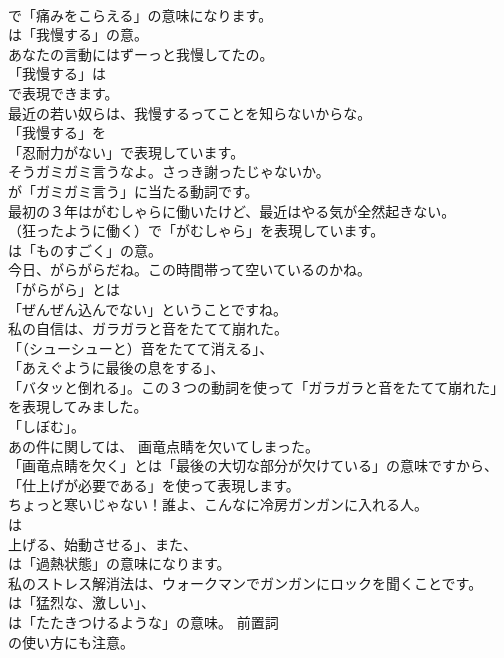 \documentclass[8pt]{extreport}
\begin{document}
\begin{CJK}{UTF8}{min}
\\	で「痛みをこらえる」の意味になります。
\\	は「我慢する」の意。	
\\	あなたの言動にはずーっと我慢してたの。 
\\	「我慢する」は 
\\	で表現できます。	
\\	最近の若い奴らは、我慢するってことを知らないからな。 
\\	「我慢する」を
\\	「忍耐力がない」で表現しています。	
\\	そうガミガミ言うなよ。さっき謝ったじゃないか。 
\\	が「ガミガミ言う」に当たる動詞です。	
\\	最初の３年はがむしゃらに働いたけど、最近はやる気が全然起きない。 
\\	（狂ったように働く）で「がむしゃら」を表現しています。
\\	は「ものすごく」の意。	
\\	今日、がらがらだね。この時間帯って空いているのかね。 
\\	「がらがら」とは
\\	「ぜんぜん込んでない」ということですね。	
\\	私の自信は、ガラガラと音をたてて崩れた。 
\\	「（シューシューと）音をたてて消える」、
\\	「あえぐように最後の息をする」、
\\	「バタッと倒れる」。この３つの動詞を使って「ガラガラと音をたてて崩れた」を表現してみました。
\\	「しぼむ」。	
\\	あの件に関しては、 画竜点睛を欠いてしまった。 
\\	「画竜点睛を欠く」とは「最後の大切な部分が欠けている」の意味ですから、
\\	「仕上げが必要である」を使って表現します。	
\\	ちょっと寒いじゃない！誰よ、こんなに冷房ガンガンに入れる人。 
\\	は
\\	上げる、始動させる」、また、
\\	は「過熱状態」の意味になります。	
\\	私のストレス解消法は、ウォークマンでガンガンにロックを聞くことです。 
\\	は「猛烈な、激しい」、
\\	は「たたきつけるような」の意味。 前置詞
\\	の使い方にも注意。	

\end{CJK}
\end{document}
